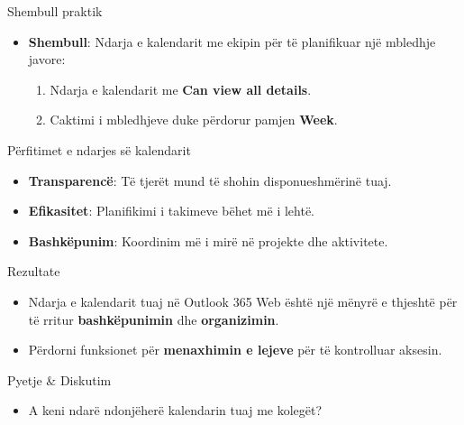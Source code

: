 \documentclass[
  ignorenonframetext,
]{beamer}
\providecommand{\tightlist}{%
  \setlength{\itemsep}{0pt}\setlength{\parskip}{0pt}}
\begin{document}
\begin{frame}{Shembull praktik}
\label{shembull-praktik}
\begin{itemize}
\item
  \textbf{Shembull}: Ndarja e kalendarit me ekipin për të planifikuar
  një mbledhje javore:

  \begin{enumerate}
  \item
    Ndarja e kalendarit me \textbf{Can view all details}.
  \item
    Caktimi i mbledhjeve duke përdorur pamjen \textbf{Week}.
  \end{enumerate}
\end{itemize}
\end{frame}

\begin{frame}{Përfitimet e ndarjes së kalendarit}
\label{puxebrfitimet-e-ndarjes-suxeb-kalendarit}
\begin{itemize}
\item
  \textbf{Transparencë}: Të tjerët mund të shohin disponueshmërinë tuaj.
\item
  \textbf{Efikasitet}: Planifikimi i takimeve bëhet më i lehtë.
\item
  \textbf{Bashkëpunim}: Koordinim më i mirë në projekte dhe aktivitete.
\end{itemize}
\end{frame}

\begin{frame}{Rezultate}
\label{rezultate-2}
\begin{itemize}
\item
  Ndarja e kalendarit tuaj në Outlook 365 Web është një mënyrë e
  thjeshtë për të rritur \textbf{bashkëpunimin} dhe
  \textbf{organizimin}.
\item
  Përdorni funksionet për \textbf{menaxhimin e lejeve} për të
  kontrolluar aksesin.
\end{itemize}
\end{frame}

\begin{frame}{Pyetje \& Diskutim}
\label{pyetje-diskutim-5}
\begin{itemize}
\tightlist
\item
  A keni ndarë ndonjëherë kalendarin tuaj me kolegët?
\end{itemize}
\end{frame}
\end{document}
